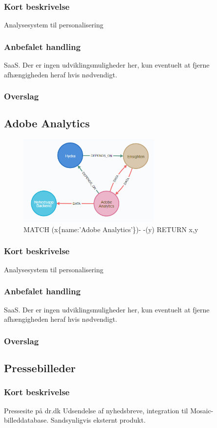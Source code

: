 \documentclass{article}
\begin{document}
\subsubsection{Kort beskrivelse}
Analysesystem til personalisering
\subsubsection{Anbefalet handling}
SaaS. Der er ingen udviklingsmuligheder her, kun eventuelt at fjerne afhængigheden heraf hvis nødvendigt.
\subsubsection{Overslag}


\subsection{Adobe Analytics}
\begin{figure}[h]
\includegraphics[width=200pt]{AdobeAnalytics.PNG}
\caption{MATCH (x\{name:'Adobe Analytics'\})- -(y) RETURN x,y}
\end{figure}
\subsubsection{Kort beskrivelse}
Analysesystem til personalisering
\subsubsection{Anbefalet handling}
SaaS. Der er ingen udviklingsmuligheder her, kun eventuelt at fjerne afhængigheden heraf hvis nødvendigt.
\subsubsection{Overslag}


\subsection{Pressebilleder}
\subsubsection{Kort beskrivelse}
Pressesite på dr.dk Udsendelse af nyhedsbreve, integration til Mosaic-billeddatabase. Sandsynligvis eksternt produkt.
\end{document}
